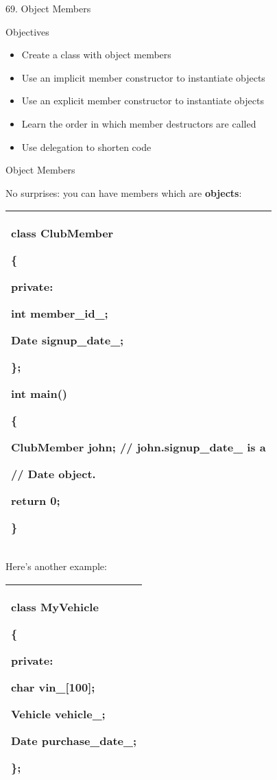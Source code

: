 \documentclass[
]{article}
\author{}
\date{}
\providecommand{\tightlist}{%
  \setlength{\itemsep}{0pt}\setlength{\parskip}{0pt}}
\begin{document}
69. Object Members

Objectives

\begin{itemize}
\tightlist
\item
  Create a class with object members
\item
  Use an implicit member constructor to instantiate objects
\item
  Use an explicit member constructor to instantiate objects
\item
  Learn the order in which member destructors are called
\item
  Use delegation to shorten code
\end{itemize}

Object Members

No surprises: you can have members which are \textbf{objects}:

\begin{longtable}[]{@{}l@{}}
\toprule
\endhead
\begin{minipage}[t]{0.97\columnwidth}\raggedright
class ClubMember

\{

private:

int member\_id\_;

\textbf{Date signup\_date\_; }

\};

int main()

\{

ClubMember john; // john.signup\_date\_ is a

// Date object.

return 0;

\}\strut
\end{minipage}\tabularnewline
\bottomrule
\end{longtable}

Here's another example:

\begin{longtable}[]{@{}l@{}}
\toprule
\endhead
\begin{minipage}[t]{0.97\columnwidth}\raggedright
class MyVehicle

\{

private:

char vin\_{[}100{]};

\textbf{Vehicle vehicle\_; }

Date purchase\_date\_;

\};\strut
\end{minipage}\tabularnewline
\bottomrule
\end{longtable}
\end{document}
